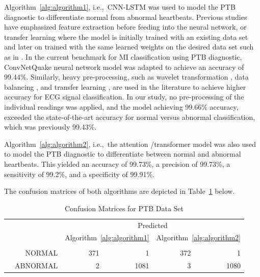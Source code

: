 \documentclass{ieeeaccess}
\begin{document}
Algorithm~\ref{alg:algorithm1}, i.e.,\ CNN-LSTM was used to model the PTB diagnostic to differentiate normal from abnormal heartbeats. Previous studies have emphasized feature extraction before feeding into the neural network, or transfer learning where the model is initially trained with an existing data set and later on trained with the same learned weights on the desired data set such as in \cite{9630333}. In the current benchmark for MI classification using PTB diagnostic, ConvNetQuake neural network model was adapted to achieve an accuracy of 99.44\%. Similarly, heavy pre-processing, such as wavelet transformation \cite{ACHARYA2017190}, data balancing \cite{latest}, and transfer learning \cite{8419425}, are used in the literature to achieve higher accuracy for ECG signal classification. In our study, no pre-processing of the individual readings was applied, and the model achieving 99.66\% accuracy, exceeded the state-of-the-art accuracy for normal versus abnormal classification, which was previously 99.43\%. 

Algorithm~\ref{alg:algorithm2}, i.e.,\ the attention /transformer model was also used to model the PTB diagnostic to differentiate between normal and abnormal heartbeats. This yielded an accuracy of 99.73\%, a precision of 99.73\%, a sensitivity of 99.2\%, and a specificity of 99.91\%.

The confusion matrices of both algorithms are depicted in Table~\ref{tbl:ConfusionMatrixPTB} below. %

\begin{table}[!ht]
	\caption{Confusion Matrices for PTB Data Set}
	\label{tbl:ConfusionMatrixPTB}
\centering
\scriptsize
{%
	\renewcommand{\arraystretch}{1.5}
	\begin{tabular}{cr|r r | r r}
		\multicolumn{2}{c}{}
		&   \multicolumn{4}{c}{Predicted}\\
		\multicolumn{2}{c|}{}
		&   \multicolumn{2}{c|}{Algorithm~\ref{alg:algorithm1}} &   \multicolumn{2}{c}{Algorithm~\ref{alg:algorithm2}}\\
		\cline{3-6}
		&	&\multicolumn{1}{c}{\rotatebox{90}{NORMAL}} &\multicolumn{1}{c|}{\rotatebox{90}{ABNORMAL }}&\multicolumn{1}{c}{\rotatebox{90}{NORMAL}} &\multicolumn{1}{c}{\rotatebox{90}{ABNORMAL }}\\
		\cline{2-6}
		\multirow{2}{*}{\rotatebox[origin=c]{90}{Actual}}
		& NORMAL 	&371	&1		&372	&1	\\	
		& ABNORMAL 	&2	    &1081	&3		&1080\\ 
	\end{tabular}
}
\end{table}
\end{document}
